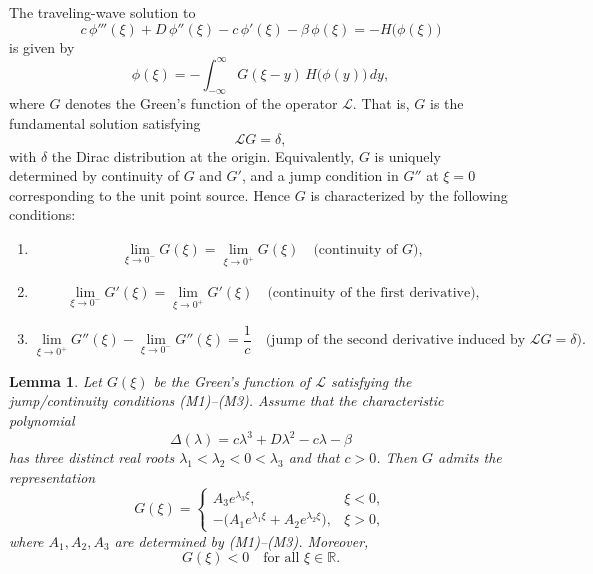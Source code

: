 \documentclass[12pt,letterpaper]{amsart}
\newtheorem{lemma}[theorem]{Lemma}
\theoremstyle{definition}
\theoremstyle{remark}
\numberwithin{equation}{section}
\begin{document}
The traveling-wave solution to
\begin{equation} \label{s1}
	c\,\phi'''(\xi) + D\,\phi''(\xi) - c\,\phi'(\xi) - \beta\,\phi(\xi)
	= -H\bigl(\phi(\xi)\bigr)
\end{equation}
is given by
\[
\phi(\xi)=-\int_{-\infty}^{\infty} G(\xi - y)\,H\bigl(\phi(y)\bigr)\,dy,
\]
where $G$ denotes the Green's function of the operator $\mathcal L$. 
That is, $G$ is the fundamental solution satisfying 
\[
\mathcal L G = \delta,
\]
with $\delta$ the Dirac distribution at the origin. 
Equivalently, $G$ is uniquely determined by continuity of $G$ and $G'$, and a jump condition in $G''$ at $\xi=0$ corresponding to the unit point source. 
Hence $G$ is characterized by the following conditions:
 \begin{enumerate}
 	\item[{(M1)}] 
 	$$
 	\lim_{\xi \to 0^-} G(\xi) = \lim_{\xi \to 0^+} G(\xi)  \quad \text{(continuity of } G),
 	$$
 	
 	\item[{(M2)}] 
 	$$
 	\lim_{\xi \to 0^-} G'(\xi) = \lim_{\xi \to 0^+} G'(\xi) \quad \text{(continuity of the first derivative),}
 	$$
 	
 	\item[{(M3)}] 
 	$$
 	\lim_{\xi \to 0^+} G''(\xi) - \lim_{\xi \to 0^-} G''(\xi) = \frac{1}{c} \quad \text{(jump of the second derivative induced by } \mathcal L G=\delta). 
 	$$
 \end{enumerate}
 
   


  \begin{lemma}\label{Green}
  	Let $G(\xi)$ be the Green's function of $\mathcal L$ satisfying the jump/continuity
  	conditions \textup{(M1)--(M3)}.
  	Assume that the characteristic polynomial
  	\[
  	\Delta(\lambda)=c\lambda^3 + D\lambda^2 - c\lambda - \beta
  	\]
  	has three distinct real roots $\lambda_1<\lambda_2<0<\lambda_3$ and that $c>0$.
  	Then $G$ admits the representation
  	\[
  	G(\xi)=
  	\begin{cases}
  		A_3 e^{\lambda_3\xi}, & \xi<0,\\[4pt]
  		- \bigl(A_1 e^{\lambda_1\xi}+A_2 e^{\lambda_2\xi}\bigr), & \xi>0,
  	\end{cases}
  	\]
  	where $A_1,A_2,A_3$ are determined by (M1)--(M3). Moreover,
  	\[
  	G(\xi)<0 \quad \text{for all }\xi\in\mathbb{R}.
  	\]
  \end{lemma}
  
\end{document}
